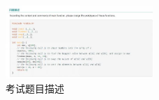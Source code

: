 \begin{figure}[h]
  \centering
  \includegraphics[width=0.5\textwidth]{image/chapter3/2}
  \caption{考试题目描述}
  \label{fig:prob_desc}
\end{figure}
